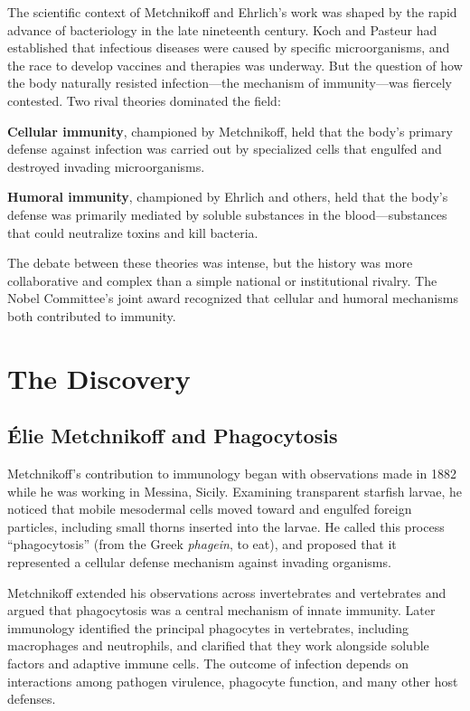 The scientific context of Metchnikoff and Ehrlich's work was shaped by the rapid advance of bacteriology in the late nineteenth century. Koch and Pasteur had established that infectious diseases were caused by specific microorganisms, and the race to develop vaccines and therapies was underway. But the question of how the body naturally resisted infection---the mechanism of immunity---was fiercely contested. Two rival theories dominated the field:

\textbf{Cellular immunity}, championed by Metchnikoff, held that the body's primary defense against infection was carried out by specialized cells that engulfed and destroyed invading microorganisms.

\textbf{Humoral immunity}, championed by Ehrlich and others, held that the body's defense was primarily mediated by soluble substances in the blood---substances that could neutralize toxins and kill bacteria.

The debate between these theories was intense, but the history was more collaborative and complex than a simple national or institutional rivalry. The Nobel Committee's joint award recognized that cellular and humoral mechanisms both contributed to immunity.

\section{The Discovery}

\subsection{\'{E}lie Metchnikoff and Phagocytosis}

Metchnikoff's contribution to immunology began with observations made in 1882 while he was working in Messina, Sicily. Examining transparent starfish larvae, he noticed that mobile mesodermal cells moved toward and engulfed foreign particles, including small thorns inserted into the larvae. He called this process ``phagocytosis'' (from the Greek \emph{phagein}, to eat), and proposed that it represented a cellular defense mechanism against invading organisms.\cite{metchnikoff-lecture}

Metchnikoff extended his observations across invertebrates and vertebrates and argued that phagocytosis was a central mechanism of innate immunity. Later immunology identified the principal phagocytes in vertebrates, including macrophages and neutrophils, and clarified that they work alongside soluble factors and adaptive immune cells. The outcome of infection depends on interactions among pathogen virulence, phagocyte function, and many other host defenses.

